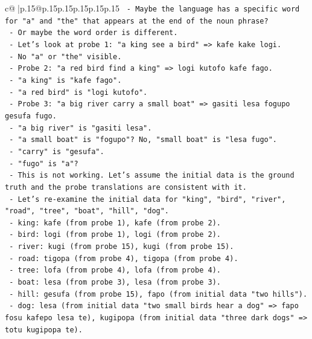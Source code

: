 \documentclass{article}
\begin{document}
{\begin{supertabular}{c@{$\;$}|p{.15\linewidth}@{}p{.15\linewidth}p{.15\linewidth}p{.15\linewidth}p{.15\linewidth}p{.15\linewidth}}
{{{\texttt{     {-} Maybe the language has a specific word for "a" and "the" that appears at the end of the noun phrase?} \\
\texttt{     {-} Or maybe the word order is different.} \\
\texttt{     {-} Let's look at probe 1: "a king see a bird" => kafe kake logi.} \\
\texttt{       {-} No "a" or "the" visible.} \\
\texttt{     {-} Probe 2: "a red bird find a king" => logi kutofo kafe fago.} \\
\texttt{       {-} "a king" is "kafe fago".} \\
\texttt{       {-} "a red bird" is "logi kutofo".} \\
\texttt{     {-} Probe 3: "a big river carry a small boat" => gasiti lesa fogupo gesufa fugo.} \\
\texttt{       {-} "a big river" is "gasiti lesa".} \\
\texttt{       {-} "a small boat" is "fogupo"? No, "small boat" is "lesa fugo".} \\
\texttt{       {-} "carry" is "gesufa".} \\
\texttt{       {-} "fugo" is "a"?} \\
\texttt{     {-} This is not working. Let's assume the initial data is the ground truth and the probe translations are consistent with it.} \\
\texttt{     {-} Let's re{-}examine the initial data for "king", "bird", "river", "road", "tree", "boat", "hill", "dog".} \\
\texttt{       {-} king: kafe (from probe 1), kafe (from probe 2).} \\
\texttt{       {-} bird: logi (from probe 1), logi (from probe 2).} \\
\texttt{       {-} river: kugi (from probe 15), kugi (from probe 15).} \\
\texttt{       {-} road: tigopa (from probe 4), tigopa (from probe 4).} \\
\texttt{       {-} tree: lofa (from probe 4), lofa (from probe 4).} \\
\texttt{       {-} boat: lesa (from probe 3), lesa (from probe 3).} \\
\texttt{       {-} hill: gesufa (from probe 15), fapo (from initial data "two hills").} \\
\texttt{       {-} dog: lesa (from initial data "two small birds hear a dog" => fapo fosu kafepo lesa te), kugipopa (from initial data "three dark dogs" => totu kugipopa te).} \\
}}}
\end{supertabular}}
\end{document}
